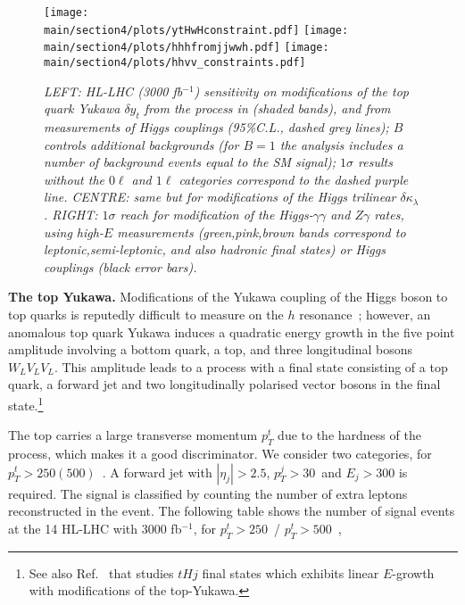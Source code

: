 \begin{figure}[t]
\begin{center}
\texttt{[image: \\main/section4/plots/ytHwHconstraint.pdf]}
\texttt{[image: \\main/section4/plots/hhhfromjjwwh.pdf]}
\texttt{[image: \\main/section4/plots/hhvv\_constraints.pdf]}
\end{center}
     \caption{\footnotesize \emph{LEFT: HL-LHC (3000 fb$^{-1}$) sensitivity on modifications of the top quark Yukawa $\delta y_t$ from the process in  (shaded bands), and from measurements of Higgs couplings (95\%C.L., dashed grey lines); $B$ controls additional backgrounds (for $B=1$ the analysis includes a number of background events equal to the SM signal); $1\sigma$ results without the $0\ell$ and $1\ell$ categories correspond to the dashed purple line. CENTRE: same but for modifications of the Higgs trilinear $\delta\kappa_\lambda$. RIGHT: $1\sigma$ reach for modification of the Higgs-$\gamma\gamma$ and $Z\gamma$ rates, using high-$E$ measurements (green,pink,brown bands correspond to leptonic,semi-leptonic, and also hadronic final states)  or Higgs couplings (black error bars). 
}}\label{fig:reach}
\end{figure} 




\vspace{5mm}
\noindent
{\bf The top Yukawa.}
Modifications of the Yukawa coupling of the Higgs boson to top quarks is reputedly difficult to measure on the $h$ resonance~\cite{Aaboud:2018urx}; however, an anomalous top quark Yukawa induces a quadratic energy growth in the five point amplitude involving a bottom quark, a top, and three longitudinal bosons $W_LV_LV_L$. This amplitude leads to a process with a final state consisting of a top quark, a forward jet and two longitudinally polarised vector bosons in the final state.\footnote{See also Ref.~\cite{Degrande:2018fog} that  studies $tHj$ final states which exhibits linear $E$-growth with modifications of the top-Yukawa.}

 The top carries a large transverse momentum $p_T^t$ due to the hardness of the process, which makes it a good discriminator. We consider two categories, for $p_T^t>250(500)$~\UGeV. A forward jet with $|\eta_j|>2.5$, $p_T^j>30$~\UGeV and $E_j>300$ \UGeV is required. The signal is classified by  counting the number of extra leptons reconstructed in the event. The following table shows the number of signal events  at the 14 \UTeV HL-LHC  with 3000 fb$^{-1}$, for $p_T^t>250$~\UGeV / $p_T^t>500$~\UGeV,
  

